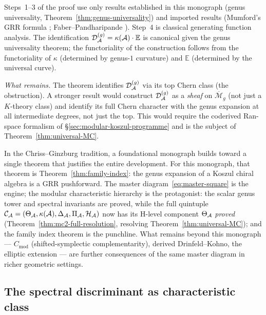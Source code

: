 \begin{remark}[Scope]\label{rem:family-index-scope}
Steps~1--3 of the proof use only results established
in this monograph (genus universality,
Theorem~\ref{thm:genus-universality}) and imported results
(Mumford's GRR formula \cite{Mumford83}; Faber--Pandharipande
\cite{FP00}).  Step~4 is classical generating function analysis.
The identification $\mathcal{D}_{\mathcal{A}}^{(g)} =
\kappa(\mathcal{A}) \cdot \mathbb{E}$ is canonical given the genus
universality theorem; the functoriality of the construction
follows from the functoriality of $\kappa$ (determined by
genus-$1$ curvature) and $\mathbb{E}$ (determined by the
universal curve).

\emph{What remains.}
The theorem identifies $\mathcal{D}_{\mathcal{A}}^{(g)}$ via its top Chern
class (the obstruction).  A stronger result would construct
$\mathcal{D}_{\mathcal{A}}^{(g)}$ as a \emph{sheaf} on
$\overline{\mathcal{M}}_g$ (not just a $K$-theory class) and
identify its full Chern character with the genus expansion at all
intermediate degrees, not just the top.  This would require the
coderived Ran-space formalism of
\S\ref{sec:modular-koszul-programme} and is the subject of
Theorem~\ref{thm:universal-MC}.
\end{remark}

\begin{remark}
\label{rem:grr-horizon}
In the Chriss--Ginzburg tradition, a foundational monograph
builds toward a single theorem that justifies the entire
development.  For this monograph, that theorem is
Theorem~\ref{thm:family-index}: the genus expansion of a
Koszul chiral algebra is a GRR pushforward.
The master diagram~\eqref{eq:master-square} is the engine;
the modular characteristic hierarchy is the protagonist:
the scalar genus tower and spectral invariants are proved,
while the full quintuple
$\mathcal{C}_{\mathcal{A}} = (\Theta_{\mathcal{A}}, \kappa(\mathcal{A}), \Delta_{\mathcal{A}},
\Pi_{\mathcal{A}}, \mathcal{H}_{\mathcal{A}})$ now has its H-level component
$\Theta_{\mathcal{A}}$ \emph{proved}
\textup{(}Theorem~\textup{\ref{thm:mc2-full-resolution}},
resolving
Theorem~\textup{\ref{thm:universal-MC}}\textup{)};
and the family index theorem is the punchline.
What remains beyond this monograph ---
$C_{\mathrm{mod}}$ (shifted-symplectic complementarity),
derived Drinfeld--Kohno, the elliptic extension ---
are further consequences of the same master diagram in richer
geometric settings.
\end{remark}

\subsection{The spectral discriminant as characteristic class}

